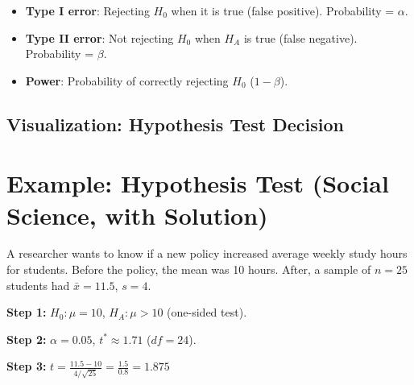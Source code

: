 \documentclass[11pt]{article}
\begin{document}
\begin{itemize}
    \item \textbf{Type I error}: Rejecting $H_0$ when it is true (false positive). Probability = $\alpha$.
    \item \textbf{Type II error}: Not rejecting $H_0$ when $H_A$ is true (false negative). Probability = $\beta$.
    \item \textbf{Power}: Probability of correctly rejecting $H_0$ ($1-\beta$).
\end{itemize}

\subsection*{Visualization: Hypothesis Test Decision}
\begin{center}
\end{center}

\section{Example: Hypothesis Test (Social Science, with Solution)}

A researcher wants to know if a new policy increased average weekly study hours for students. Before the policy, the mean was 10 hours. After, a sample of $n=25$ students had $\bar{x}=11.5$, $s=4$.

\textbf{Step 1:} $H_0: \mu=10$, $H_A: \mu>10$ (one-sided test).

\textbf{Step 2:} $\alpha=0.05$, $t^* \approx 1.71$ ($df=24$).

\textbf{Step 3:} $t = \frac{11.5-10}{4/\sqrt{25}} = \frac{1.5}{0.8} = 1.875$
\end{document}
